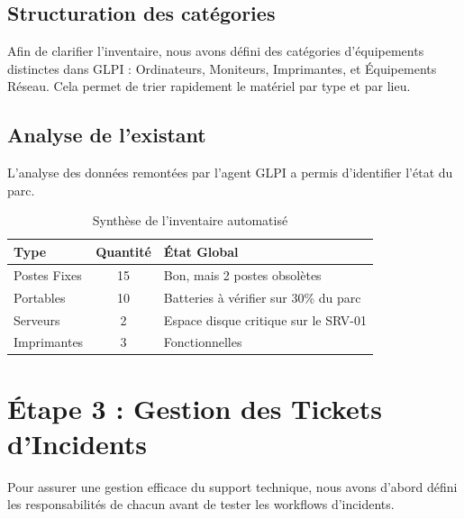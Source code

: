 \documentclass[a4paper,11pt]{article}
\begin{document}
\subsection{Structuration des catégories}
Afin de clarifier l'inventaire, nous avons défini des catégories d'équipements distinctes dans GLPI : Ordinateurs, Moniteurs, Imprimantes, et Équipements Réseau. Cela permet de trier rapidement le matériel par type et par lieu.

\subsection{Analyse de l'existant}
L'analyse des données remontées par l'agent GLPI a permis d'identifier l'état du parc.
\begin{table}[H]
\centering
\begin{tabular}{|l|c|l|}
\hline
\textbf{Type} & \textbf{Quantité} & \textbf{État Global} \\ \hline
Postes Fixes & 15 & Bon, mais 2 postes obsolètes \\ \hline
Portables & 10 & Batteries à vérifier sur 30\% du parc \\ \hline
Serveurs & 2 & Espace disque critique sur le SRV-01 \\ \hline
Imprimantes & 3 & Fonctionnelles \\ \hline
\end{tabular}
\caption{Synthèse de l'inventaire automatisé}
\end{table}

\section{Étape 3 : Gestion des Tickets d'Incidents}

Pour assurer une gestion efficace du support technique, nous avons d'abord défini les responsabilités de chacun avant de tester les workflows d'incidents.
\end{document}
